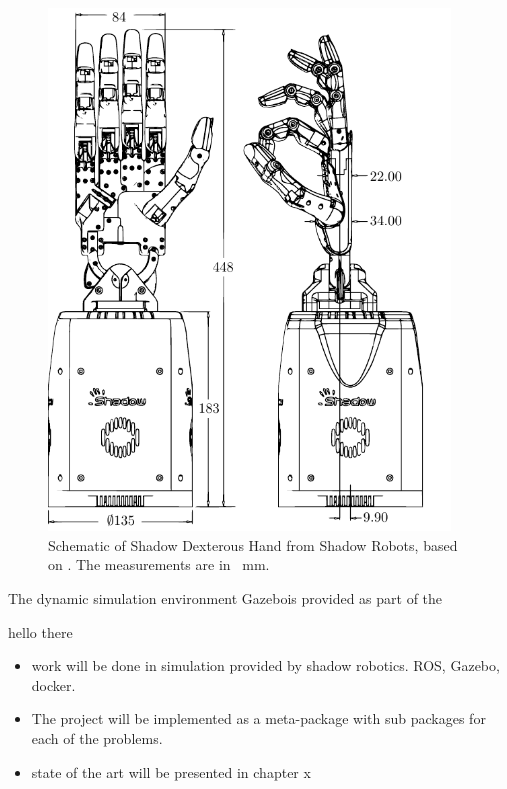 	\begin{minipage}{0.45\textwidth}
	\begin{figure}[H]
		\begin{small}
			\begin{center}
				\includegraphics[width=0.95\textwidth]{chapters/introduction/fig/shadow-dex-hand-vector.pdf}
			\end{center}
			\caption{Schematic of Shadow Dexterous Hand from Shadow Robots, based on \cite{shadow-dex-hand-schematic}. The measurements are in \SI{}{\milli\metre}.}
			\label{fig:shadow-dex-hand-schematic}
		\end{small}
	\end{figure}
\end{minipage}

The dynamic simulation environment Gazebo\fakecite is provided as part of the 

hello there
\begin{itemize}
	\item work will be done in simulation provided by shadow robotics\fakecite. ROS, Gazebo, docker.
	\item The project will be implemented as a meta-package with sub packages for each of the problems.
	\item state of the art will be presented in chapter x
\end{itemize}

